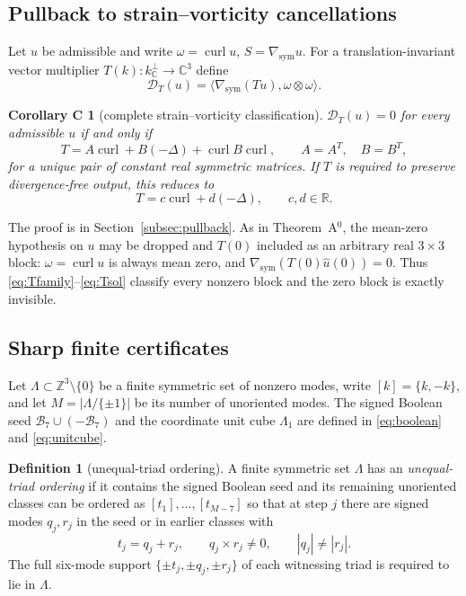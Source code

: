 \documentclass[11pt]{article}
\theoremstyle{definition}
\newtheorem{definition}[theorem]{Definition}
\theoremstyle{remark}
\theoremstyle{plain}
\newtheorem*{corC}{Corollary C}
\DeclareMathOperator{\curl}{curl}
\newcommand{\Z}{\mathbb{Z}}
\newcommand{\R}{\mathbb{R}}
\newcommand{\C}{\mathbb{C}}
\newcommand{\Dform}{\mathcal{D}}
\newcommand{\kperp}{k_{\C}^{\perp}}
\newcommand{\gsym}{\nabla_{\mathrm{sym}}}
\begin{document}
\subsection{Pullback to strain--vorticity cancellations}
\label{subsec:corC}

Let $u$ be admissible and write $\omega=\curl u$, $S=\gsym u$. For a
translation-invariant vector multiplier $T(k):\kperp\to\C^{3}$ define
\begin{equation}
\label{eq:Dform}
\Dform_{T}(u)
=\langle\gsym(Tu),\omega\otimes\omega\rangle .
\end{equation}

\begin{corC}[complete strain--vorticity classification]
\label{cor:C}
$\Dform_{T}(u)=0$ for every admissible $u$ if and only if
\begin{equation}
\label{eq:Tfamily}
T=A\curl+B(-\Delta)+\curl B\curl,
\qquad A=A^{T},\quad B=B^{T} ,
\end{equation}
for a unique pair of constant real symmetric matrices. If $T$ is required to
preserve divergence-free output, this reduces to
\begin{equation}
\label{eq:Tsol}
T=c\curl+d(-\Delta),
\qquad c,d\in\R .
\end{equation}
\end{corC}

The proof is in Section~\ref{subsec:pullback}. As in Theorem~A$^{0}$, the
mean-zero hypothesis on $u$ may be dropped and $T(0)$ included as an arbitrary
real $3\times3$ block: $\omega=\curl u$ is always mean zero, and
$\gsym(T(0)\widehat u(0))=0$. Thus \eqref{eq:Tfamily}--\eqref{eq:Tsol}
classify every nonzero block and the zero block is exactly invisible.

\subsection{Sharp finite certificates}
\label{subsec:thmD}

Let $\Lambda\subset\Z^{3}\setminus\{0\}$ be a finite symmetric set of nonzero
modes, write $[k]=\{k,-k\}$, and let $M=|\Lambda/\{\pm1\}|$ be its number of
unoriented modes. The signed Boolean seed $\mathcal B_{7}\cup(-\mathcal
B_{7})$ and the coordinate unit cube $\Lambda_{1}$ are defined in
\eqref{eq:boolean} and \eqref{eq:unitcube}.

\begin{definition}[unequal-triad ordering]
\label{def:unequal}
A finite symmetric set $\Lambda$ has an \emph{unequal-triad ordering} if it
contains the signed Boolean seed and its remaining unoriented classes can be
ordered as $[t_{1}],\dots,[t_{M-7}]$ so that at step $j$ there are signed modes
$q_{j},r_{j}$ in the seed or in earlier classes with
\[
t_{j}=q_{j}+r_{j},
\qquad
q_{j}\times r_{j}\ne0,
\qquad
|q_{j}|\ne|r_{j}| .
\]
The full six-mode support $\{\pm t_{j},\pm q_{j},\pm r_{j}\}$ of each
witnessing triad is required to lie in $\Lambda$.
\end{definition}
\end{document}

